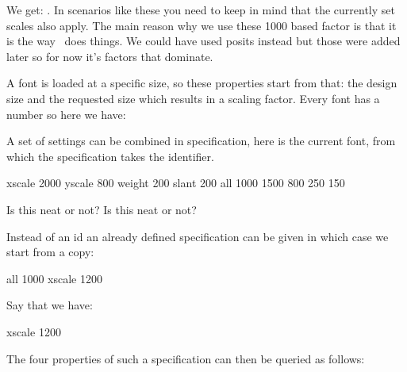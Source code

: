 We get: \inlinebuffer. In scenarios like these you need to keep in mind that the
currently set scales also apply. The main reason why we use these 1000 based
factor is that it is the way \TEX\ does things. We could have used posits instead
but those were added later so for now it's factors that dominate.

\stopsubsection

\startsubsection[title=Specifications]

A font is loaded at a specific size, so these properties start from that: the
design size and the requested size which results in a scaling factor. Every font
has a number so here we have:

\startbuffer
\tf \the \fontid \font \hskip1cm
\bf \the \fontid \font \hskip1cm
\sl \the \fontid \font
\stopbuffer

\typebuffer[option=TEX]

\start \getbuffer \stop

A set of settings can be combined in specification, here \type {\font} is the
current font, from which the specification takes the identifier.

\startbuffer
\fontspecdef \MyFontA \font xscale 2000 yscale 800 weight 200 slant 200 \relax
\fontspecdef \MyFontB \font all 1000 1500 800 250 150 \relax

\begingroup \MyFontA Is this neat or not? \endgroup
\begingroup \MyFontB Is this neat or not? \endgroup
\stopbuffer

\typebuffer[option=TEX]

\startlines \getbuffer \stoplines

Instead of an id an already defined specification can be given in which case we
start from a copy:

\starttyping[option=TEX]
\fontspecdef {} all 1000
\fontspecdef \MyFontB \MyFontA xscale 1200
\stoptyping

Say that we have:

\startbuffer
\fontspecdef\MyFoo\font xscale 1200 \relax
\stopbuffer

\typebuffer[option=TEX] \getbuffer

The four properties of such a specification can then be queried as follows:

\startbuffer
[\the\fontspecid       \MyFoo]
[\the\fontspecscale    \MyFoo]
[\the\fontspecxscale   \MyFoo]
[\the\fontspecyscale   \MyFoo]
[\the\fontspecifiedsize\MyFoo]
[\fontspecifiedname    \MyFoo]
\stopbuffer

\typebuffer[option=TEX] \getbuffer

